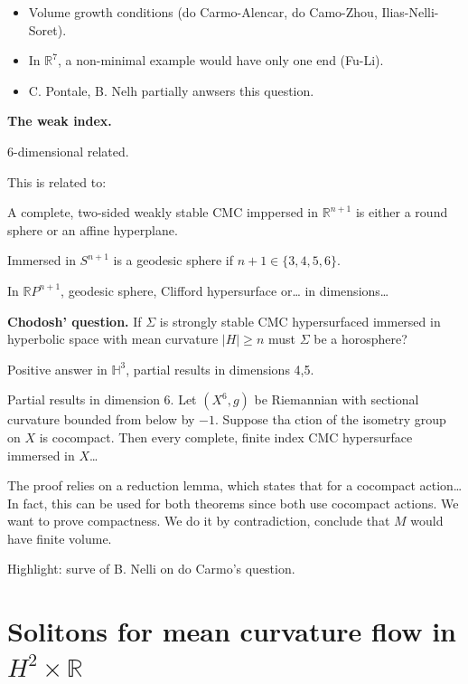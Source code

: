 \begin{itemize}
\item Volume growth conditions (do
Carmo-Alencar, do Camo-Zhou,
Ilias-Nelli-Soret).
\item In $\mathbb{R}^7$, a non-minimal
example would have only one end (Fu-Li).
\item C. Pontale, B. Nelh partially anwsers
this question.
\end{itemize}

\medskip\noindent
{\bf The weak index.}

\begin{theorem}[M]
\label{theorem-m}
6-dimensional related.
\end{theorem}

\noindent
This is related to:

\begin{theorem}
\label{theorem-classification-cmc}
A complete, two-sided weakly stable CMC
imppersed in $\mathbb{R}^{n+1}$
is either a round sphere or an affine
hyperplane.

Immersed in $S^{n+1}$ is a geodesic sphere
if $n+1 \in \{ 3,4,5,6\}$.

In $\mathbb{R}P^{n+1}$, geodesic sphere,
Clifford hypersurface or… in dimensions…
\end{theorem}

\medskip\noindent
{\bf Chodosh' question.} If $\Sigma$ is
strongly stable CMC hypersurfaced immersed
in hyperbolic space with mean curvature
$|H|\geq  n$ must $\Sigma$ be a horosphere?

Positive answer in $\mathbb{H}^3$, partial
results in dimensions 4,5.

\begin{theorem}[M]
\label{theorem-m2}
Partial results in dimension 6. Let
$(X^6,g)$ be Riemannian with sectional
curvature bounded from below by $-1$.
Suppose tha ction of the isometry group on
$X$ is cocompact. Then every complete,
finite index CMC hypersurface immersed in
$X$…
\end{theorem}

\noindent
The proof relies on a reduction lemma, which
states that for a cocompact action… In fact,
this can be used for both theorems since
both use cocompact actions. We want to prove
compactness. We do it by contradiction,
conclude that $M$ would have finite volume.

Highlight: surve of B. Nelli on do Carmo's
question.
\section{Solitons for mean curvature flow
in $H^2 \times \mathbb{R}$}
\label{section-mcf-solitons-h2r}

